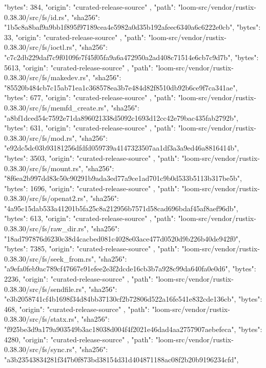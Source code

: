 {{      "bytes": 384,
      "origin": "curated-release-source"
    },
    {
      "path": "loom-src/vendor/rustix-0.38.30/src/fs/id.rs",
      "sha256": "1b5c8a8baf9a9bb1f895f97189cea4e5982a0d35b192afeec6340a6c6222e0cb",
      "bytes": 33,
      "origin": "curated-release-source"
    },
    {
      "path": "loom-src/vendor/rustix-0.38.30/src/fs/ioctl.rs",
      "sha256": "c7c2db229daf7c9f0109fe7f45f05fa9a6a472950a2ad408c71514e6cb7c9d7b",
      "bytes": 5613,
      "origin": "curated-release-source"
    },
    {
      "path": "loom-src/vendor/rustix-0.38.30/src/fs/makedev.rs",
      "sha256": "85520b484cb7c15ab71ea1c368578ea3b7e484d82f8510db92b6ce9f7ca341ae",
      "bytes": 677,
      "origin": "curated-release-source"
    },
    {
      "path": "loom-src/vendor/rustix-0.38.30/src/fs/memfd_create.rs",
      "sha256": "a8bf1dced54c7592e71da896021338d5092c1693d12cc42e79bac435fab2792b",
      "bytes": 631,
      "origin": "curated-release-source"
    },
    {
      "path": "loom-src/vendor/rustix-0.38.30/src/fs/mod.rs",
      "sha256": "e92dc5dc03b93181256dfdfd059739a4147323507aa1df3a3a9ed46a8816414b",
      "bytes": 3503,
      "origin": "curated-release-source"
    },
    {
      "path": "loom-src/vendor/rustix-0.38.30/src/fs/mount.rs",
      "sha256": "8f6ea2b997dd83c50c90291b9ada3ed77a9ce1ad701c9b0d533b5113b317be5b",
      "bytes": 1696,
      "origin": "curated-release-source"
    },
    {
      "path": "loom-src/vendor/rustix-0.38.30/src/fs/openat2.rs",
      "sha256": "4a95c15dab533a41201b5fa25c8a212956b7571d58cad696bdaf45af8aef96db",
      "bytes": 613,
      "origin": "curated-release-source"
    },
    {
      "path": "loom-src/vendor/rustix-0.38.30/src/fs/raw_dir.rs",
      "sha256": "18ad797876d6230c38d4cacbed081c4028e03ace477d0520d9b226b40de942f0",
      "bytes": 7385,
      "origin": "curated-release-source"
    },
    {
      "path": "loom-src/vendor/rustix-0.38.30/src/fs/seek_from.rs",
      "sha256": "a9efa0feb9ac789cf47667e91efee2e3f2dcde16cb3b7a928c99da640fa0e0d6",
      "bytes": 2236,
      "origin": "curated-release-source"
    },
    {
      "path": "loom-src/vendor/rustix-0.38.30/src/fs/sendfile.rs",
      "sha256": "e3b2058741cf4b1698f34d84bb37130cf2b72806d522a16fe541e832cde136cb",
      "bytes": 468,
      "origin": "curated-release-source"
    },
    {
      "path": "loom-src/vendor/rustix-0.38.30/src/fs/statx.rs",
      "sha256": "f925be3d9a179a903549b3ac18038d004f4f2021e46dad4aa2757907aebefeca",
      "bytes": 4280,
      "origin": "curated-release-source"
    },
    {
      "path": "loom-src/vendor/rustix-0.38.30/src/fs/sync.rs",
      "sha256": "a3b23543834281f347b0f873bd38154d31d404871188ac08f2b20b9196234cfd",
}}
